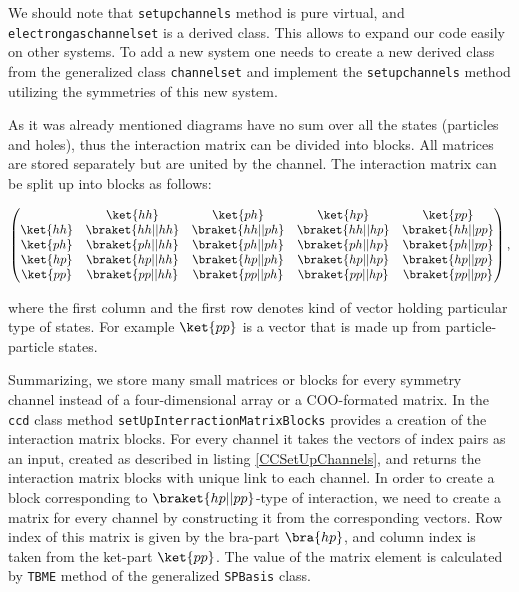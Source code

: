 \documentclass[twoside,english]{uiofysmaster}
\newcommand{\classname}[1]{\texttt{#1}}
\begin{document}
We should note that \classname{setupchannels} method is pure virtual,
and\\ \classname{electrongaschannelset} is a derived class. This allows
to expand our code easily on other systems. To add a new system one
needs to create a new derived class from the generalized class
\classname{channelset} and implement the \classname{setupchannels} method
utilizing the symmetries of this new system.

As it was already mentioned diagrams have no sum over all the states
(particles and holes), thus the interaction matrix can be divided into
blocks. All matrices are stored separately but are united by the
channel. The interaction matrix can be split up into blocks as
follows:

\[
\begin{pmatrix} 

&\ket{hh} & \ket{ph} & \ket{hp} & \ket{pp}   \\
\ket{hh} & \braket{hh||hh} & \braket{hh||ph} & \braket{hh||hp} & \braket{hh||pp} \\
\ket{ph} & \braket{ph||hh} & \braket{ph||ph} & \braket{ph||hp} & \braket{ph||pp} \\
\ket{hp} & \braket{hp||hh} & \braket{hp||ph} & \braket{hp||hp} & \braket{hp||pp} \\
\ket{pp} & \braket{pp||hh} & \braket{pp||ph} & \braket{pp||hp} & \braket{pp||pp} \\

\end{pmatrix},
\]

where the first column and the first row denotes kind of vector
holding particular type of states. For example $\ket{pp}$ is a vector
that is made up from particle-particle states.

Summarizing, we store many small matrices or blocks for every symmetry
channel instead of a four-dimensional array or a COO-formated matrix.
In the \classname{ccd} class method
\classname{setUpInterractionMatrixBlocks} provides a creation of the
interaction matrix blocks. For every channel it takes the vectors of
index pairs as an input, created as described in listing
\ref{CCSetUpChannels}, and returns the interaction matrix blocks with
unique link to each channel. In order to create a block corresponding
to $\braket{hp||pp}$-type of interaction, we need to create a matrix
for every channel by constructing it from the corresponding
vectors. Row index of this matrix is given by the bra-part $\bra{hp}$,
and column index is taken from the ket-part $\ket{pp}$. The value of
the matrix element is calculated by \classname{TBME} method of the
generalized \classname{SPBasis} class.
\end{document}
